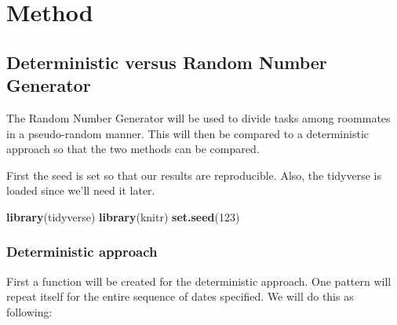 \documentclass[openany]{book}
\newenvironment{Shaded}{\begin{snugshade}}{\end{snugshade}}
\newcommand{\DecValTok}[1]{\textcolor[rgb]{0.00,0.00,0.81}{#1}}
\newcommand{\KeywordTok}[1]{\textcolor[rgb]{0.13,0.29,0.53}{\textbf{#1}}}
\newcommand{\NormalTok}[1]{#1}
\begin{document}
\hypertarget{method}{%
\chapter{Method}\label{method}}

\hypertarget{deterministic-versus-random-number-generator}{%
\section{Deterministic versus Random Number Generator}\label{deterministic-versus-random-number-generator}}

The Random Number Generator will be used to divide tasks among roommates in a pseudo-random manner. This will then be compared to a deterministic approach so that the two methods can be compared.

First the seed is set so that our results are reproducible. Also, the tidyverse is loaded since we'll need it later.

\begin{Shaded}
\begin{Highlighting}[]
\KeywordTok{library}\NormalTok{(tidyverse)}
\KeywordTok{library}\NormalTok{(knitr)}
\KeywordTok{set.seed}\NormalTok{(}\DecValTok{123}\NormalTok{)}
\end{Highlighting}
\end{Shaded}

\hypertarget{deterministic-approach}{%
\subsection*{Deterministic approach}\label{deterministic-approach}}

First a function will be created for the deterministic approach. One pattern will repeat itself for the entire sequence of dates specified. We will do this as following:
\end{document}
